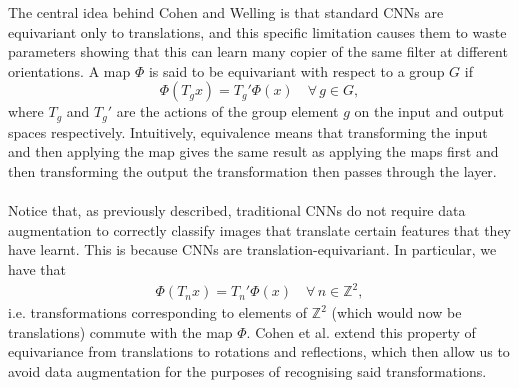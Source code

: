 \documentclass{article}
\begin{document}
The central idea behind Cohen and Welling is that standard CNNs are equivariant only to translations, and this specific limitation causes them to waste parameters showing that this can learn many copier of the same filter at different orientations. A map $\Phi$ is said to be equivariant with respect to a group $G$ if
\[
\Phi(T_g x) = T_g' \Phi(x) \quad \forall\, g \in G,
\]
where $T_g$ and $T_g'$ are the actions of the group element $g$ on the input and output spaces respectively. Intuitively, equivalence means that transforming the input and then applying the map gives the same result as applying the maps first and then transforming the output the transformation then passes through the layer. \\ \\
Notice that, as previously described, traditional CNNs do not require data augmentation to correctly classify images that translate certain features that they have learnt. This is because CNNs are translation-equivariant. In particular, we have that
\begin{align*}
    \Phi(T_n x) = T_n' \Phi(x) \quad \forall\, n \in \mathbb{Z}^2,
\end{align*}
i.e. transformations corresponding to elements of \(\mathbb{Z}^2\) (which would now be translations) commute with the map \(\Phi\). Cohen et al. extend this property of equivariance from translations to rotations and reflections, which then allow us to avoid data augmentation for the purposes of recognising said transformations.
\end{document}
